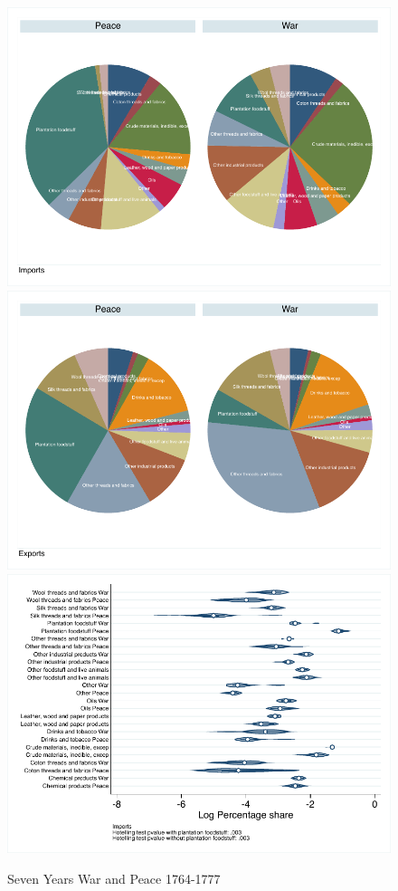 \documentclass[12pt,a4paper,notitlepage,english]{article}
\begin{document}
\begin{figure}
\centering
\caption{Seven Years War and Peace 1764-1777}
\label{post_seven_composition}
\includegraphics[scale=.63]{post_seven_composition_I}
\includegraphics[scale=.63]{post_seven_composition_X}
\vspace{0.7cm}
\includegraphics[scale=.63]{post_seven_distribution_I}

\end{figure}
\end{document}
